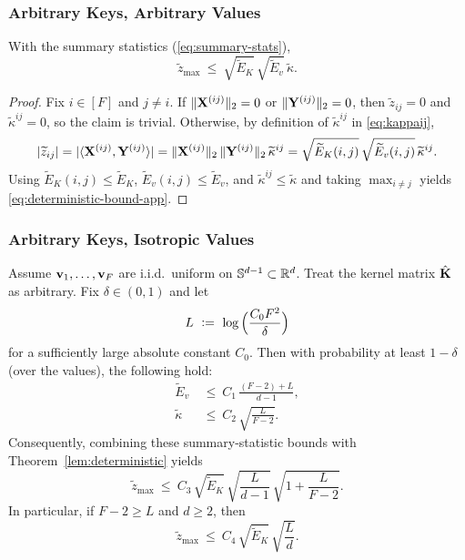 \subsubsection{Arbitrary Keys, Arbitrary Values}
\label{app:deterministic}

\begin{theorem}
\label{lem:deterministic}
With the summary statistics (\eqref{eq:summary-stats}),
\begin{equation}
\widetilde{z}_{\max}\ \le\ \sqrt{\widetilde{E}_K}\,\sqrt{\widetilde{E}_v}\,\widetilde{\kappa}.
\label{eq:deterministic-bound-app}
\end{equation}
\end{theorem}

\begin{proof}
Fix $i\in[F]$ and $j\neq i$.
If $\|\mathbf{X}^{(ij)}\|_{2}=0$ or $\|\mathbf{Y}^{(ij)}\|_{2}=0$, then $\widetilde{z}_{ij}=0$ and $\widetilde{\kappa}^{ij}=0$, so the claim is trivial.
Otherwise, by definition of $\widetilde{\kappa}^{ij}$ in \eqref{eq:kappaij},
\[
|\widetilde{z}_{ij}| = |\langle {\mathbf{X}^{(ij)}}, {\mathbf{Y}^{(ij)}} \rangle| = \|\mathbf{X}^{(ij)}\|_{2}\,\|\mathbf{Y}^{(ij)}\|_{2}\,\widetilde{\kappa}^{ij}
= \sqrt{\widetilde{E}_{K}(i,j)}\,\sqrt{\widetilde{E}_{v}(i,j)}\,\widetilde{\kappa}^{ij}.
\]
Using $\widetilde{E}_{K}(i,j)\le \widetilde{E}_{K}$, $\widetilde{E}_{v}(i,j)\le \widetilde{E}_{v}$, and $\widetilde{\kappa}^{ij}\le\widetilde{\kappa}$ and taking $\max_{i\neq j}$ yields \eqref{eq:deterministic-bound-app}.
\end{proof}


\subsubsection{Arbitrary Keys, Isotropic Values}
\begin{theorem}
\label{app:regime1}
Assume ${\mathbf{v}}_{1},\dots,{\mathbf{v}}_{F}$ are i.i.d.\ uniform on $\mathbb{S}^{d-1}\subset\mathbb{R}^{d}$.
Treat the kernel matrix $\hat{\mathbf{K}}$ as arbitrary.
Fix $\delta\in(0,1)$ and let
\[
L\ \vcentcolon=\ \log\Big(\frac{C_{0} F^2}{\delta}\Big)
\]
for a sufficiently large absolute constant $C_{0}$.
Then with probability at least $1-\delta$ (over the values), the following hold:
\begin{align*}
\widetilde{E}_{v}
&\ \le\ C_{1}\,\frac{(F-2)+L}{d-1},\\
\widetilde{\kappa}
&\ \le\ C_{2}\,\sqrt{\frac{L}{F-2}}.
\end{align*}
Consequently, combining these summary-statistic bounds with Theorem~\ref{lem:deterministic} yields
\[
\widetilde{z}_{\max}
\ \le\
 C_{3}\,\sqrt{\widetilde{E}_K}\,\sqrt{\frac{L}{d-1}}\,\sqrt{1+\frac{L}{F-2}}.
\]
In particular, if $F-2\ge L$ and $d\ge 2$, then
\[
\widetilde{z}_{\max}
\ \le\
 C_{4}\,\sqrt{\widetilde{E}_K}\,\sqrt{\frac{L}{d}}.
\]
\end{theorem}

